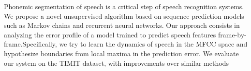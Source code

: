 Phonemic segmentation of speech is a critical step of speech recognition systems. We propose a novel unsupervised algorithm based on sequence prediction models such as Markov chains and recurrent neural networks. Our approach consists in analyzing the error profile of a model trained to predict speech features frame-by-frame.Specifically, we try to learn the dynamics of speech in the MFCC space and hypothesize boundaries from local maxima in the prediction error. We evaluate our system on the TIMIT dataset, with improvements over similar methods
